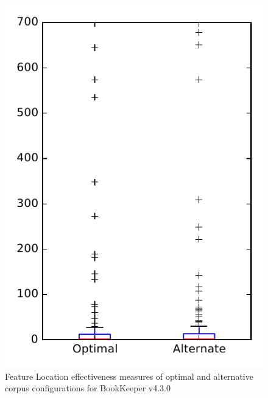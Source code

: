 
\begin{figure}
\centering
\includegraphics[height=0.4\textheight]{figures/combo/flt_rq2_bookkeeper}
\caption{Feature Location effectiveness measures of optimal and alternative corpus configurations for BookKeeper v4.3.0}
\label{fig:combo:flt:rq2:bookkeeper}
\end{figure}
